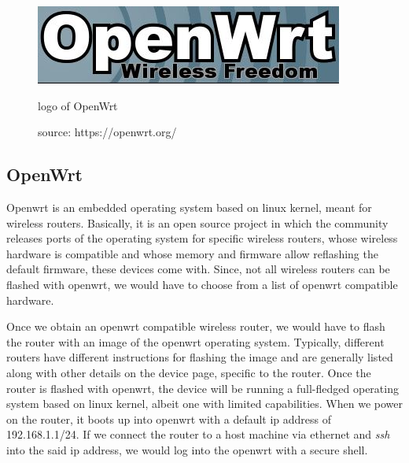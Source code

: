 \begin{figure}
	\centering
	\includegraphics[scale=1]{Pictures/openwrt_logo.jpg}
	\caption{logo of OpenWrt}
	\label{fig: openwrt}
	\caption*{source: https://openwrt.org/}
\end{figure}

\subsection{OpenWrt}
Openwrt is an embedded operating system based on linux kernel, meant for wireless routers. Basically, it is an open source project in which the community releases ports of the operating system for specific wireless routers, whose wireless hardware is compatible and whose memory and firmware allow reflashing the default firmware, these devices come with. Since, not all wireless routers can be flashed with openwrt, we would have to choose from a list of openwrt compatible hardware.

Once we obtain an openwrt compatible wireless router, we would have to flash the router with an image of the openwrt operating system. Typically, different routers have different instructions for flashing the image and are generally listed along with other details on the device page, specific to the router. Once the router is flashed with openwrt, the device will be running a full-fledged operating system based on linux kernel, albeit one with limited capabilities. When we power on the router, it boots up into openwrt with a default ip address of 192.168.1.1/24. If we connect the router to a host machine via ethernet and \textit{ssh} into the said ip address, we would log into the openwrt with a secure shell.






